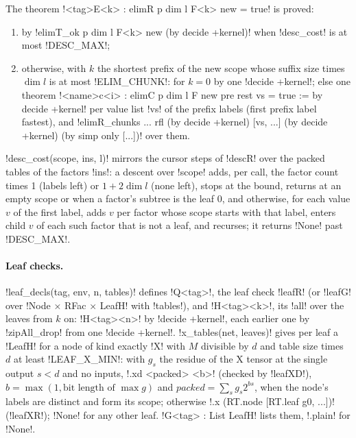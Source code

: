 {{{\begin{algorithm}\label{alg:lean-export-refute-elimdecls}
The theorem \lexlean!<tag>E<k> : elimR p dim l F<k> new = true! is proved:
\begin{enumerate}
\item by \lexlean!elimT_ok p dim l F<k> new (by decide +kernel)! when \lexpy!desc_cost! is at most
\lexpy!DESC_MAX!;
\item otherwise, with $k$ the shortest prefix of the new scope whose suffix size times
$\dim l$ is at most \lexpy!ELIM_CHUNK!: for $k = 0$ by one \lexlean!decide +kernel!; else one theorem
\lexlean!<name>c<i> : elimC p dim l F new pre rest vs = true := by decide +kernel! per value list
\lexcode!vs! of the prefix labels (first prefix label fastest), and \lexlean!elimR_chunks ... rfl (by decide +kernel) [vs, ...] (by decide +kernel) (by simp only [...])!
over them.
\end{enumerate}
\lexpy!desc_cost(scope, ins, l)! mirrors the cursor steps of \lexlean!descR! over the packed tables of
the factors \lexcode!ins!: a descent over \lexcode!scope! adds, per call, the factor count times 1
(labels left) or $1 + 2\dim l$ (none left), stops at the bound, returns at an empty scope or
when a factor's subtree is the leaf 0, and otherwise, for each value $v$ of the first label,
adds $v$ per factor whose scope starts with that label, enters child $v$ of each such factor
that is not a leaf, and recurses; it returns \lexpy!None! past \lexpy!DESC_MAX!.
\end{algorithm}

\paragraph{Leaf checks.} \lexpy!leaf_decls(tag, env, n, tables)! defines \lexlean!Q<tag>!, the leaf
check \lexlean!leafR! (or \lexlean!leafG! over \lexlean!Node × RFac × LeafH! with \lexlean!tables!), and
\lexlean!H<tag><k>!, its \lexlean!all! over the leaves from $k$ on: \lexlean!H<tag><n>! by
\lexlean!decide +kernel!, each earlier one by \lexlean!zipAll_drop! from one \lexlean!decide +kernel!.
\lexpy!x_tables(net, leaves)! gives per leaf a \lexlean!LeafH! for a node of kind exactly \lexcode!X!
with $M$ divisible by $d$ and table size times $d$ at least \lexpy!LEAF_X_MIN!: with $g_s$ the
residue of the X tensor at the single output $s < d$ and no inputs, \lexlean!.xd <packed> <b>!
(checked by \lexlean!leafXD!), $b = \max(1, \text{bit length of } \max g)$ and
$\mathit{packed} = \sum_s g_s 2^{bs}$, when the node's labels are distinct and form its scope;
otherwise \lexlean!.x (RT.node [RT.leaf g0, ...])! (\lexlean!leafXR!); \lexpy!None! for any other leaf.
\lexlean!G<tag> : List LeafH! lists them, \lexlean!.plain! for \lexpy!None!.

}}}
